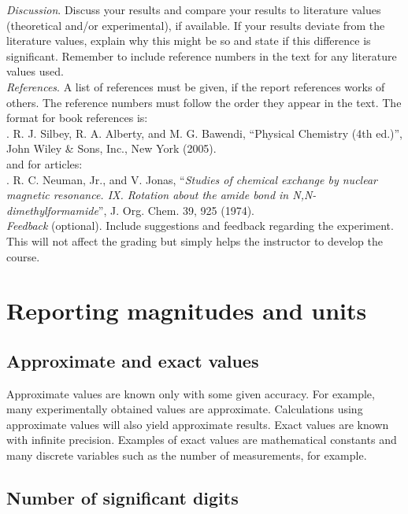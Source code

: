 \documentclass[byrevtex,amssymb,aps,pra,floatfix,letterpaper]{revtex4}
\begin{document}
\noindent
\textit{Discussion}. Discuss your results and compare your results to literature values (theoretical and/or experimental), if available. 
If your results deviate from the literature values, explain why this might be so and state if this difference is significant. Remember to include reference numbers in the text for any literature values used.\\

\noindent
\textit{References}. A list of references must be given, if the report references works of others. The reference numbers must follow the order they appear in the text. The format for book
references is:\\

. R. J. Silbey, R. A. Alberty, and M. G. Bawendi, ``Physical Chemistry (4th ed.)'', John Wiley \& Sons, Inc., New York (2005).\\

\noindent
and for articles:\\

. R. C. Neuman, Jr., and V. Jonas, ``\textit{Studies of chemical exchange by nuclear magnetic resonance. IX. Rotation about the amide bond in N,N-dimethylformamide}'', J. Org. Chem. 39, 925 (1974).\\

\noindent
\textit{Feedback} (optional). Include suggestions and feedback regarding the experiment. This will not affect the grading but simply helps the instructor to develop the course.

\section{Reporting magnitudes and units}
\label{sec5}

\subsection{Approximate and exact values}

Approximate values are known only with some given accuracy. For example, many experimentally obtained values are approximate. Calculations using approximate values will also yield approximate results. Exact values are known with infinite precision. Examples of exact values are mathematical constants and many discrete variables such as the number of measurements, for example.

\subsection{Number of significant digits}
\end{document}
